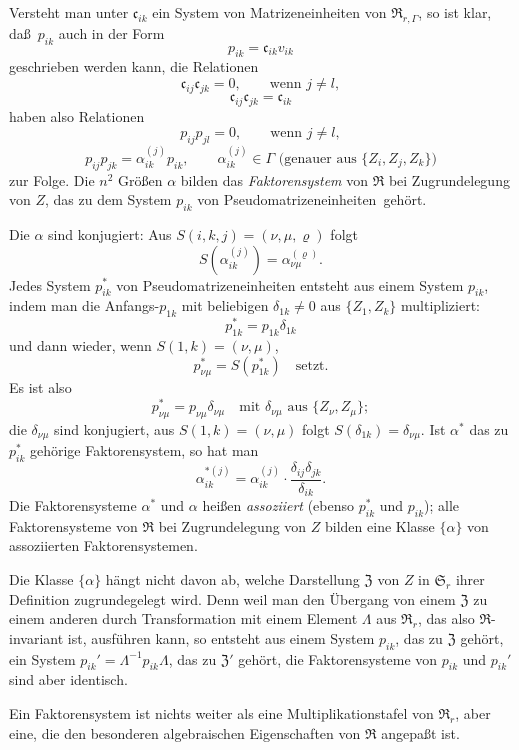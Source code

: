 \documentclass[12pt,a4paper]{article}
\theoremstyle{plain}
\theoremstyle{definition}
\theoremstyle{remark}
\begin{document}
Versteht man unter $\mathfrak{c}_{ik}$ ein System von Matrizeneinheiten von $\mathfrak{R}_{r,\varGamma}$,
so ist klar, da\ss\ $p_{ik}$ auch in der Form
\[
p_{ik} = \mathfrak{c}_{ik}v_{ik}
\]
geschrieben werden kann, die Relationen
\[
\mathfrak{c}_{ij}\mathfrak{c}_{jk} = 0, \qquad \text{wenn } j \neq l,
\]
\[
\mathfrak{c}_{ij}\mathfrak{c}_{jk} = \mathfrak{c}_{ik}
\]
haben also Relationen
\[
p_{ij}p_{jl} = 0, \qquad \text{wenn } j \neq l,
\]
\[
p_{ij}p_{jk} = \alpha_{ik}^{(j)}p_{ik}, \qquad \alpha_{ik}^{(j)} \in \varGamma
\text{ (genauer aus } \{Z_{i}, Z_{j}, Z_{k}\})
\]
zur Folge. Die $n^{2}$ Gr\"o\ss en $\alpha$ bilden das \textit{Faktorensystem} von $\mathfrak{R}$ bei
Zugrundelegung von $Z$, das zu dem System $p_{ik}$ von \glqq Pseudomatrizeneinheiten\grqq\ geh\"ort.

Die $\alpha$ sind konjugiert: Aus $S(i, k, j) = (\nu, \mu, \varrho)$ folgt
\[
S(\alpha_{ik}^{(j)}) = \alpha_{\nu\mu}^{(\varrho)}.
\]
Jedes System $p_{ik}^{*}$ von Pseudomatrizeneinheiten entsteht aus einem System
$p_{ik}$, indem man die Anfangs-$p_{1k}$ mit beliebigen $\delta_{1k} \neq 0$ aus
$\{Z_{1}, Z_{k}\}$ multipliziert:
\[
p_{1k}^{*} = p_{1k}\delta_{1k}
\]
und dann wieder, wenn $S(1, k) = (\nu, \mu)$,
\[
p_{\nu\mu}^{*} = S(p_{1k}^{*}) \quad \text{setzt}.
\]
Es ist also
\[
p_{\nu\mu}^{*} = p_{\nu\mu}\delta_{\nu\mu} \quad \text{mit } \delta_{\nu\mu} \text{ aus } \{Z_{\nu}, Z_{\mu}\};
\]
die $\delta_{\nu\mu}$ sind konjugiert, aus $S(1, k) = (\nu, \mu)$ folgt
$S(\delta_{1k}) = \delta_{\nu\mu}$. Ist $\alpha^{*}$ das zu $p_{ik}^{*}$ geh\"orige
Faktorensystem, so hat man
\[
\alpha_{ik}^{*(j)} = \alpha_{ik}^{(j)} \cdot \frac{\delta_{ij}\delta_{jk}}{\delta_{ik}}.
\]
Die Faktorensysteme $\alpha^{*}$ und $\alpha$ hei\ss en \textit{assoziiert} (ebenso $p_{ik}^{*}$ und
$p_{ik}$); alle Faktorensysteme von $\mathfrak{R}$ bei Zugrundelegung von $Z$ bilden eine
Klasse $\{\alpha\}$ von assoziierten Faktorensystemen.

Die Klasse $\{\alpha\}$ h\"angt nicht davon ab, welche Darstellung $\mathfrak{Z}$ von $Z$ in
$\mathfrak{S}_{r}$ ihrer Definition zugrundegelegt wird. Denn weil man den \"Ubergang von
einem $\mathfrak{Z}$ zu einem anderen durch Transformation mit einem Element $\Lambda$ aus
$\mathfrak{R}_{r}$, das also $\mathfrak{R}$-invariant ist, ausf\"uhren kann, so entsteht aus einem System
$p_{ik}$, das zu $\mathfrak{Z}$ geh\"ort, ein System $p_{ik}' = \Lambda^{-1}p_{ik}\Lambda$, das zu
$\mathfrak{Z}'$ geh\"ort, die Faktorensysteme von $p_{ik}$ und $p_{ik}'$ sind aber identisch.

Ein Faktorensystem ist nichts weiter als eine Multiplikationstafel von
$\mathfrak{R}_{r}$, aber eine, die den besonderen algebraischen Eigenschaften von $\mathfrak{R}$
angepa\ss t ist.
\end{document}

